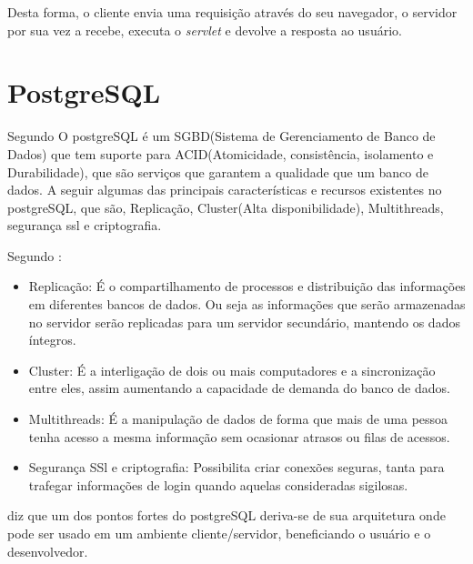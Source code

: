  
 
	\par Desta forma, o cliente envia uma requisição através do seu navegador, o
servidor por sua vez a recebe, executa o \textit{servlet} e devolve a resposta
ao usuário.

\section{PostgreSQL}

\par Segundo  O postgreSQL é um SGBD(Sistema de
Gerenciamento de Banco de Dados) que tem suporte para ACID(Atomicidade,
consistência, isolamento e Durabilidade), que são serviços que garantem a
qualidade que um banco de dados. A seguir algumas das principais
características e recursos existentes no postgreSQL, que são, Replicação,
Cluster(Alta disponibilidade), Multithreads, segurança ssl e criptografia.

\par Segundo :
	\begin{itemize}
	  
	  \item Replicação: É o compartilhamento de processos e distribuição das
	  informações em diferentes bancos de dados. Ou seja as informações que serão
	  armazenadas no servidor serão replicadas para um servidor secundário,
	  mantendo os dados íntegros.
	  
	  \item Cluster: É a interligação de dois ou mais computadores e a
	  sincronização entre eles, assim aumentando a capacidade de demanda do banco
	  de dados. 
	  
	  \item Multithreads: É a manipulação de dados de forma que mais de uma pessoa
	  tenha acesso a mesma informação sem ocasionar atrasos ou filas de acessos.
	  
	  \item Segurança SSl e criptografia: Possibilita criar conexões seguras,
	  tanta para trafegar informações de login quando aquelas consideradas sigilosas.
   
	\end{itemize}
	
	\par {}  diz que um dos pontos fortes do
postgreSQL deriva-se de sua arquitetura onde pode ser usado em um ambiente
cliente/servidor, beneficiando o usuário e o desenvolvedor.

